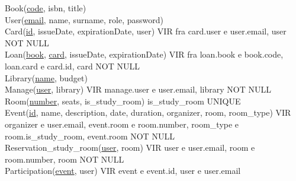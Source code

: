 \begin{tcolorbox}
	Book(\underline{code}, isbn, title)\\
	User(\underline{email}, name, surname, role, password)\\
	Card(\underline{id}, issueDate, expirationDate, user) VIR fra card.user e user.email, user NOT NULL\\
	Loan(\underline{book}, \underline{card}, issueDate, expirationDate) VIR fra loan.book e book.code, loan.card e card.id, card NOT NULL\\
	Library(\underline{name}, budget)\\
	Manage(\underline{user}, library) VIR manage.user e user.email, library NOT NULL\\
	Room(\underline{number}, seats, is\_study\_room) is\_study\_room UNIQUE\\
	Event(\underline{id}, name, description, date, duration, organizer, room, room\_type) VIR organizer e user.email, event.room e room.number, room\_type e room.is\_study\_room, event.room NOT NULL\\
	Reservation\_study\_room(\underline{user}, room) VIR user e user.email, room e room.number, room NOT NULL\\
	Participation(\underline{event}, user) VIR event e event.id, user e user.email
\end{tcolorbox}





















